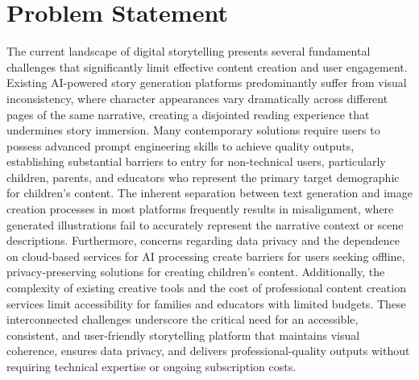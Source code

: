 \section{Problem Statement}
The current landscape of digital storytelling presents several fundamental challenges that significantly limit effective content creation and user engagement. Existing AI-powered story generation platforms predominantly suffer from visual inconsistency, where character appearances vary dramatically across different pages of the same narrative, creating a disjointed reading experience that undermines story immersion. Many contemporary solutions require users to possess advanced prompt engineering skills to achieve quality outputs, establishing substantial barriers to entry for non-technical users, particularly children, parents, and educators who represent the primary target demographic for children's content. The inherent separation between text generation and image creation processes in most platforms frequently results in misalignment, where generated illustrations fail to accurately represent the narrative context or scene descriptions. Furthermore, concerns regarding data privacy and the dependence on cloud-based services for AI processing create barriers for users seeking offline, privacy-preserving solutions for creating children's content. Additionally, the complexity of existing creative tools and the cost of professional content creation services limit accessibility for families and educators with limited budgets. These interconnected challenges underscore the critical need for an accessible, consistent, and user-friendly storytelling platform that maintains visual coherence, ensures data privacy, and delivers professional-quality outputs without requiring technical expertise or ongoing subscription costs.

